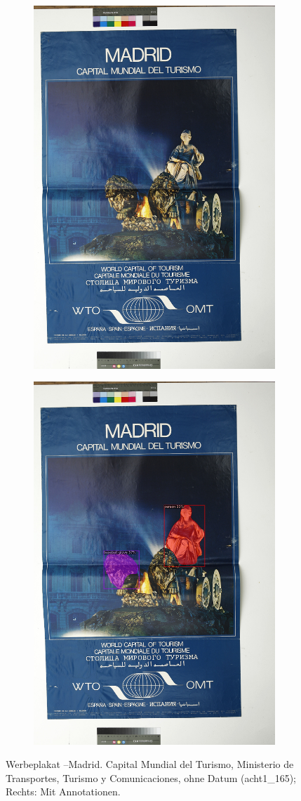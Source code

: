 \documentclass[a4paper,12pt,ngerman]{article}
\begin{document}
\newpage
\begin{landscape}
\begin{figure}[ht]
	\begin{subfigure}[b]{0.5\linewidth}
	\centering
	\includegraphics[height=\linewidth]{Abbildung_25_(acht1_165)}
	\end{subfigure}
	\begin{subfigure}[b]{0.5\linewidth}
	\centering
	\includegraphics[height=\linewidth]{Abbildung_25_(acht1_165)_with_detections}
	\end{subfigure}
	\caption{Werbeplakat –Madrid. Capital Mundial del Turismo, Ministerio de Transportes, Turismo y Comunicaciones, ohne Datum (acht1\_165); Rechts: Mit Annotationen.}
\end{figure}
\end{landscape}
\end{document}
